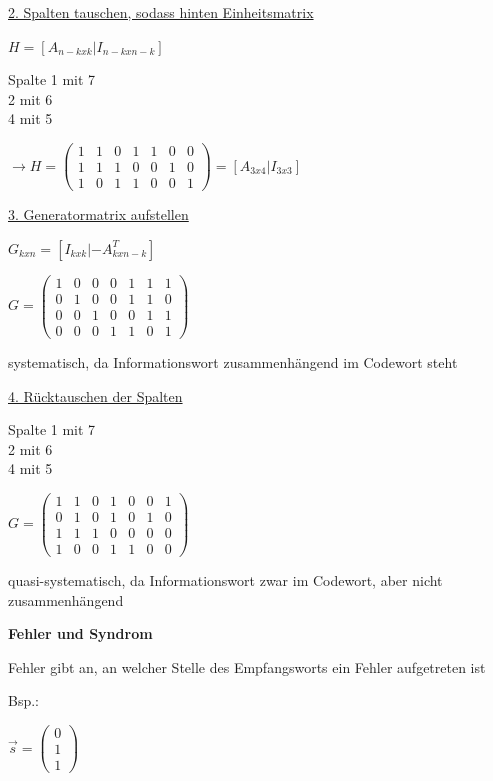 \underline{2. Spalten tauschen, sodass hinten Einheitsmatrix}

$H = [A_{n-k x k} | I_{n-k x n-k} ]$

Spalte 1 mit 7\\
2 mit 6\\
4 mit 5

$\displaystyle{
    \rightarrow H = \begin{pmatrix}
        1 & 1 & 0 & 1 & 1 & 0 & 0\\
        1 & 1 & 1 & 0 & 0 & 1 & 0\\
        1 & 0 & 1 & 1 & 0 & 0 & 1
    \end{pmatrix} = [ A_{3 x 4} | I_{3 x 3} ]
}$

\underline{3. Generatormatrix aufstellen}

$G_{k x n} = [I_{k x k} | -A^T_{k x n-k} ]$

$\displaystyle{
    G = \begin{pmatrix}
        1 & 0 & 0 & 0 & 1 & 1 & 1\\
        0 & 1 & 0 & 0 & 1 & 1 & 0\\
        0 & 0 & 1 & 0 & 0 & 1 & 1\\
        0 & 0 & 0 & 1 & 1 & 0 & 1
    \end{pmatrix}
}$

systematisch, da Informationswort zusammenhängend im Codewort steht

\underline{4. Rücktauschen der Spalten}

Spalte 1 mit 7\\
2 mit 6\\
4 mit 5

$\displaystyle{
    G = \begin{pmatrix}
        1 & 1 & 0 & 1 & 0 & 0 & 1\\
        0 & 1 & 0 & 1 & 0 & 1 & 0\\
        1 & 1 & 1 & 0 & 0 & 0 & 0\\
        1 & 0 & 0 & 1 & 1 & 0 & 0
    \end{pmatrix}
}$

quasi-systematisch, da Informationswort zwar im Codewort, aber nicht zusammenhängend

\textbf{Fehler und Syndrom}

Fehler gibt an, an welcher Stelle des Empfangsworts ein Fehler aufgetreten ist

Bsp.:

$\displaystyle{
    \vec{s} = \begin{pmatrix}
        0\\
        1\\
        1
    \end{pmatrix}
}$

